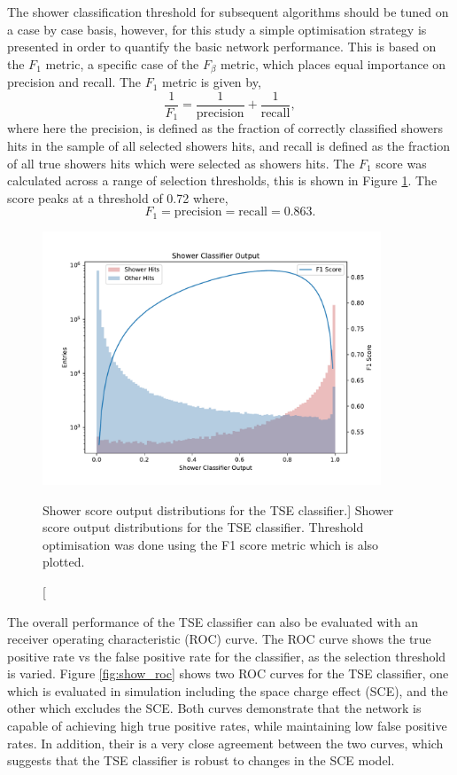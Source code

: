 The shower classification threshold for subsequent algorithms should be tuned on
a case by case basis, however, for this study a simple optimisation strategy 
is presented in order to quantify the basic network performance. This is based
on the $F_1$ metric, a specific case of the $F_\beta$ 
metric\cite{VanRijsbergenC.J.1975Ir}, which places equal importance on 
precision and recall. The $F_1$ metric is given by, 
\begin{equation*}
	\frac{1}{F_1} = \frac{1}{\mbox{precision}} + \frac{1}{\mbox{recall}},
\end{equation*}
where here the precision, is defined as the fraction of correctly classified 
showers hits in the sample of all selected showers hits, and recall is defined 
as the fraction of all true showers hits which were selected as showers hits. 
The $F_1$ score was calculated across a range of selection thresholds, this is 
shown in Figure \ref{fig:show_output}. The score peaks at a threshold of 0.72 
where,
\begin{equation*}
	F_1 = \mbox{precision} = \mbox{recall} = 0.863.
\end{equation*}

\begin{figure}
	\centering
	\includegraphics[width=0.9\textwidth]{figures/shower_combined.pdf} 
	\caption
	[Shower score output distributions for the TSE classifier.]
	{Shower score output distributions for the TSE classifier. Threshold 
	optimisation was done using the F1 score metric which is also plotted.}
	\label{fig:show_output}
\end{figure}

The overall performance of the TSE classifier can also be evaluated with an
receiver operating characteristic (ROC) curve\cite{Fawcett2006}. The ROC curve
shows the true positive rate vs the false positive rate for the classifier, as
the selection threshold is varied. Figure \ref{fig:show_roc} shows two ROC
curves for the TSE classifier, one which is evaluated in simulation including
the space charge effect (SCE), and the other which excludes the SCE. Both curves
demonstrate that the network is capable of achieving high true positive rates,
while maintaining low false positive rates. In addition, their is a very close
agreement between the two curves, which suggests that the TSE classifier is
robust to changes in the SCE model.

